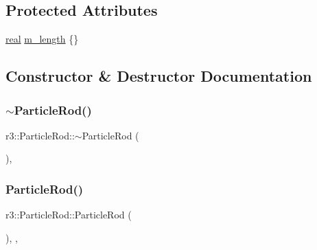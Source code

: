 \subsection*{Protected Attributes}
\begin{DoxyCompactItemize}
\item 
\mbox{\hyperlink{namespacer3_ab2016b3e3f743fb735afce242f0dc1eb}{real}} \mbox{\hyperlink{classr3_1_1_particle_rod_af146e442c0ddcb83161f115da58fa026}{m\+\_\+length}} \{\}
\end{DoxyCompactItemize}


\subsection{Constructor \& Destructor Documentation}
\mbox{\label{classr3_1_1_particle_rod_aa6fd377f7694d3d64ef4135e6bd4299e}} 
\subsubsection{\texorpdfstring{$\sim$\+Particle\+Rod()}{~ParticleRod()}}
{\footnotesize\ttfamily r3\+::\+Particle\+Rod\+::$\sim$\+Particle\+Rod (\begin{DoxyParamCaption}{ }\end{DoxyParamCaption})\hspace{0.3cm}{\ttfamily [virtual]}, {\ttfamily [default]}}

\mbox{\label{classr3_1_1_particle_rod_a5ceef2a44c266092396799440c9c674f}} 
\subsubsection{\texorpdfstring{Particle\+Rod()}{ParticleRod()}}
{\footnotesize\ttfamily r3\+::\+Particle\+Rod\+::\+Particle\+Rod (\begin{DoxyParamCaption}{ }\end{DoxyParamCaption})\hspace{0.3cm}{\ttfamily [explicit]}, {\ttfamily [protected]}, {\ttfamily [default]}}



